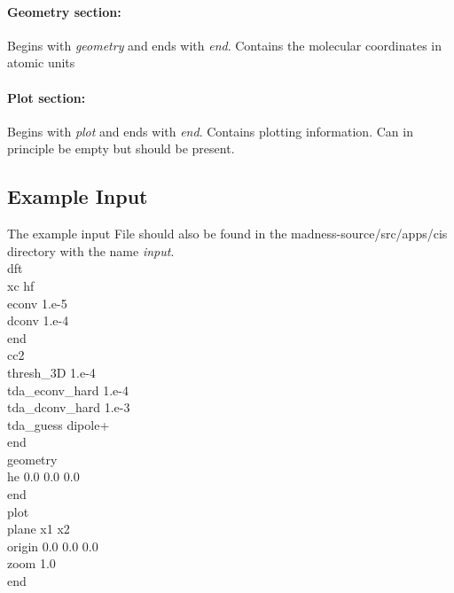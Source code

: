\documentclass[10pt,a4paper]{scrartcl}
\begin{document}
\paragraph{Geometry section:} Begins with \textit{geometry} and ends with \textit{end}. Contains the molecular coordinates in atomic units
\paragraph{Plot section:} Begins with \textit{plot} and ends with \textit{end}. Contains plotting information. Can in principle be empty but should be present. 
\subsection{Example Input}
The example input File should also be found in the madness-source/src/apps/cis directory with the name \textit{input}.\\


dft\\
  xc hf\\
  econv 1.e-5\\
  dconv 1.e-4\\
end\\

cc2\\
  thresh\_3D 1.e-4\\
  tda\_econv\_hard 1.e-4\\
  tda\_dconv\_hard 1.e-3\\
  tda\_guess dipole+ \\
end\\

geometry\\
	he 0.0 0.0 0.0\\
end\\

plot \\
 plane x1 x2\\
 origin 0.0 0.0 0.0\\
 zoom 1.0\\
end



\end{document}
